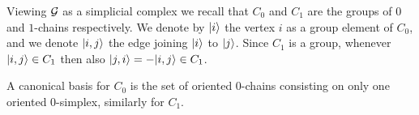 \documentclass[../2.tex]{subfiles}
\begin{document}

    Viewing $\mathcal{G}$ as a simplicial complex we recall that $C_0$ and $C_1$ are the groups of $0$ and $1$-chains respectively. We denote by $| i \rangle$
    the vertex $i$ as a group element of $C_0$, and we denote $| i,j \rangle$ the edge joining $| i \rangle$ to $| j \rangle$.
    Since $C_1$ is a group, whenever $| i,j \rangle \in C_1$ then also $| j,i \rangle = -| i,j \rangle \in C_1$. 
    
    A canonical basis for $C_0$ is the set of oriented $0$-chains consisting on only one oriented $0$-simplex, 
    similarly for $C_1$.
\end{document}
